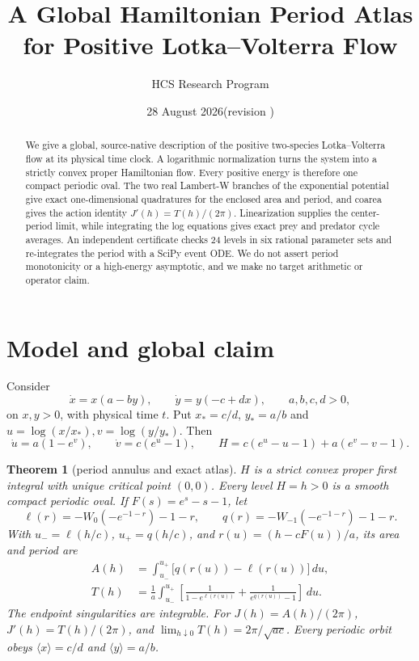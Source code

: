 \documentclass[11pt]{article}
\title{A Global Hamiltonian Period Atlas for Positive Lotka--Volterra Flow}
\author{HCS Research Program}
\date{28 August 2026\quad (revision \CRevisionRound)}
\newtheorem{theorem}{Theorem}
\begin{document}
\maketitle
\begin{abstract}
We give a global, source-native description of the positive two-species
Lotka--Volterra flow at its physical time clock.  A logarithmic normalization
turns the system into a strictly convex proper Hamiltonian flow.  Every
positive energy is therefore one compact periodic oval.  The two real
Lambert-W branches of the exponential potential give exact one-dimensional
quadratures for the enclosed area and period, and coarea gives the action
identity $J'(h)=T(h)/(2\pi)$.  Linearization supplies the center-period limit,
while integrating the log equations gives exact prey and predator cycle
averages.  An independent certificate checks 24 levels in six rational
parameter sets and re-integrates the period with a SciPy event ODE.  We do not
assert period monotonicity or a high-energy asymptotic, and we make no target
arithmetic or operator claim.
\end{abstract}

\section{Model and global claim}
Consider
\[
 \dot x=x(a-by),\qquad \dot y=y(-c+dx),\qquad a,b,c,d>0,
\]
on $x,y>0$, with physical time $t$.  Put $x_*=c/d$, $y_*=a/b$ and
$u=\log(x/x_*),v=\log(y/y_*)$.  Then
\[
 \dot u=a(1-e^v),\qquad \dot v=c(e^u-1),\qquad
 H=c(e^u-u-1)+a(e^v-v-1).
\]

\begin{theorem}[period annulus and exact atlas]\label{thm:atlas}
$H$ is a strict convex proper first integral with unique critical point
$(0,0)$.  Every level $H=h>0$ is a smooth compact periodic oval.  If
$F(s)=e^s-s-1$, let
\[
 \ell(r)=-W_0(-e^{-1-r})-1-r,\qquad
 q(r)=-W_{-1}(-e^{-1-r})-1-r.
\]
With $u_-=\ell(h/c)$, $u_+=q(h/c)$, and
$r(u)=(h-cF(u))/a$, its area and period are
\begin{align*}
 A(h)&=\int_{u_-}^{u_+}\bigl[q(r(u))-\ell(r(u))\bigr]\,du,\\
 T(h)&=\frac1a\int_{u_-}^{u_+}\left[
 \frac1{1-e^{\ell(r(u))}}+\frac1{e^{q(r(u))}-1}\right]\,du.
\end{align*}
The endpoint singularities are integrable.  For $J(h)=A(h)/(2\pi)$,
$J'(h)=T(h)/(2\pi)$, and
$\lim_{h\downarrow0}T(h)=2\pi/\sqrt{ac}$.  Every periodic orbit obeys
$\langle x\rangle=c/d$ and $\langle y\rangle=a/b$.
\end{theorem}
\end{document}
